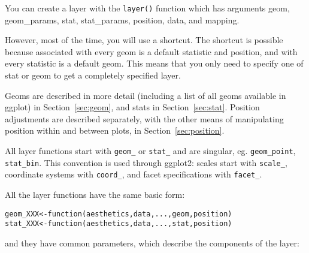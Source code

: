 You can create a layer with the {\tt layer()} function which has arguments geom, geom\_params, stat, stat\_params, position, data, and mapping.

However, most of the time, you will use a shortcut.  The shortcut is possible because associated with every geom is a default statistic and position, and with every statistic is a default geom.  This means that you only need to specify one of stat or geom to get a completely specified layer.

Geoms are described in more detail (including a list of all geoms available in ggplot) in Section~\ref{sec:geom}, and stats in Section~\ref{sec:stat}.  Position adjustments are described separately, with the other means of manipulating position within and between plots, in Section~\ref{sec:position}.

All layer functions start with {\tt geom\_} or {\tt stat\_} and are singular, eg. {\tt geom\_point}, {\tt stat\_bin}.  This convention is used through ggplot2: scales start with {\tt scale\_}, coordinate systems with {\tt coord\_}, and facet specifications with {\tt facet\_}.

All the layer functions have the same basic form:

\begin{alltt}
geom_XXX <- function(aesthetics, data, ..., geom, position) {}
stat_XXX <- function(aesthetics, data, ..., stat, position) {}
\end{alltt}

\noindent and they have common parameters, which describe the components of the layer:

